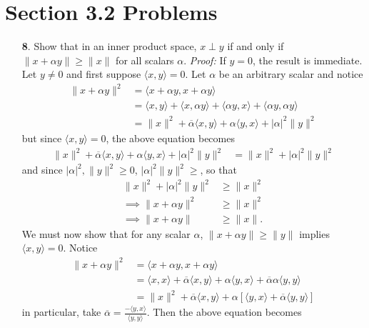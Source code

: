 \documentclass{article}
\newcommand{\inp}[2]{\langle #1, #2 \rangle}
\begin{document}
\section*{Section 3.2 Problems}
\begin{itemize}
    \item[\textbf{8}.] Show that in an inner product space, $x \perp y$ if and only if $\|x + \alpha y\| \geq \|x\|$ for all scalars $\alpha$.
    \newline\newline
    \textit{Proof:} If $y = 0$, the result is immediate. Let $y \neq 0$ and first suppose $\langle x, y \rangle = 0$. Let $\alpha$ be an arbitrary scalar and notice
    \begin{align*}
        \|x + \alpha y\|^2 &= \inp{x + \alpha y}{x + \alpha y}\\
        &= \inp{x}{y} + \inp{x}{\alpha y} + \inp{\alpha y}{x} + \inp{\alpha y}{\alpha y}\\
        &= \|x\|^2 + \overline{\alpha}\inp{x}{y} + \alpha \inp{y}{x} + |\alpha|^2\|y\|^2
    \end{align*}
    but since $\inp{x}{y} = 0$, the above equation becomes
    \begin{align*}
        \|x\|^2 + \overline{\alpha}\inp{x}{y} + \alpha \inp{y}{x} + |\alpha|^2\|y\|^2 &= \|x\|^2 + |\alpha|^2\|y\|^2
    \end{align*}
    and since $|\alpha|^2, \|y\|^2 \geq 0$, $|\alpha|^2\|y\|^2 \geq$, so that 
    \begin{align*}
        \|x\|^2 + |\alpha|^2\|y\|^2 &\geq \|x\|^2\\
        \implies \|x + \alpha y\|^2 &\geq \|x\|^2\\
        \implies \|x + \alpha y \| &\geq \|x\|.
    \end{align*}
    We must now show that for any scalar $\alpha$, $\|x + \alpha y\| \geq \|y\|$ implies $\inp{x}{y} = 0$. Notice
    \begin{align*}
        \|x + \alpha y\|^2 &= \inp{x + \alpha y}{x + \alpha y}\\
        &= \inp{x}{x} + \overline{\alpha}\inp{x}{y} + \alpha\inp{y}{x} + \overline{\alpha}\alpha\inp{y}{y}\\
        &= \|x\|^2 + \overline{\alpha}\inp{x}{y} +\alpha [\inp{y}{x} + \overline{\alpha}\inp{y}{y}]
    \end{align*}
    in particular, take $\overline{\alpha} = \frac{-\inp{y}{x}}{\inp{y}{y}}$. Then the above equation becomes
    \begin{align*}

\end{align*}
\end{itemize}
\end{document}
